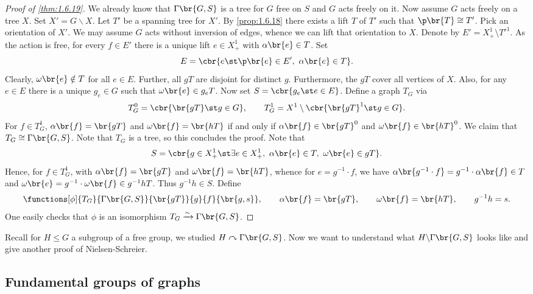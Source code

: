 \begin{proof}[Proof of \ref{thm:1.6.19}]
We already know that $ \Gamma\br{G, S} $ is a tree for $ G $ free on $ S $ and $ G $ acts freely on it. Now assume $ G $ acts freely on a tree $ X $. Set $ X' = G \backslash X $. Let $ T' $ be a spanning tree for $ X' $. By \ref{prop:1.6.18} there exists a lift $ T $ of $ T' $ such that $ \p\br{T} \cong T' $. Pick an orientation of $ X' $. We may assume $ G $ acts without inversion of edges, whence we can lift that orientation to $ X $. Denote by $ E' = X_+^1 \setminus T'^1 $. As the action is free, for every $ f \in E' $ there is a unique lift $ e \in X_+^1 $ with $ \alpha\br{e} \in T $. Set
$$ E = \cbr{e \st \p\br{e} \in E', \ \alpha\br{e} \in T}. $$
Clearly, $ \omega\br{e} \notin T $ for all $ e \in E $. Further, all $ gT $ are disjoint for distinct $ g $. Furthermore, the $ gT $ cover all vertices of $ X $. Also, for any $ e \in E $ there is a unique $ g_e \in G $ such that $ \omega\br{e} \in g_eT $. Now set $ S = \cbr{g_e \st e \in E} $. Define a graph $ T_G $ via
$$ T_G^0 = \cbr{\br{gT} \st g \in G}, \qquad T_G^1 = X^1 \setminus \cbr{\br{gT}^1 \st g \in G}. $$
For $ f \in T_G^1 $, $ \alpha\br{f} = \br{gT} $ and $ \omega\br{f} = \br{hT} $ if and only if $ \alpha\br{f} \in \br{gT}^0 $ and $ \omega\br{f} \in \br{hT}^0 $. We claim that $ T_G \cong \Gamma\br{G, S} $. Note that $ T_G $ is a tree, so this concludes the proof. Note that
$$ S = \cbr{g \in X_+^1 \st \exists e \in X_+^1, \ \alpha\br{e} \in T, \ \omega\br{e} \in gT}. $$
Hence, for $ f \in T_G^1 $, with $ \alpha\br{f} = \br{gT} $ and $ \omega\br{f} = \br{hT} $, whence for $ e = g^{-1} \cdot f $, we have $ \alpha\br{g^{-1} \cdot f} = g^{-1} \cdot \alpha\br{f} \in T $ and $ \omega\br{e} = g^{-1} \cdot \omega\br{f} \in g^{-1}hT $. Thus $ g^{-1}h \in S $. Define
$$ \functions[\phi]{T_G}{\Gamma\br{G, S}}{\br{gT}}{g}{f}{\br{g, s}}, \qquad \alpha\br{f} = \br{gT}, \qquad \omega\br{f} = \br{hT}, \qquad g^{-1}h = s. $$
One easily checks that $ \phi $ is an isomorphism $ T_G \xrightarrow{\sim} \Gamma\br{G, S} $.
\end{proof}

Recall for $ H \le G $ a subgroup of a free group, we studied $ H \curvearrowright \Gamma\br{G, S} $. Now we want to understand what $ H \backslash \Gamma\br{G, S} $ looks like and give another proof of Nielsen-Schreier.

\subsection{Fundamental groups of graphs}

